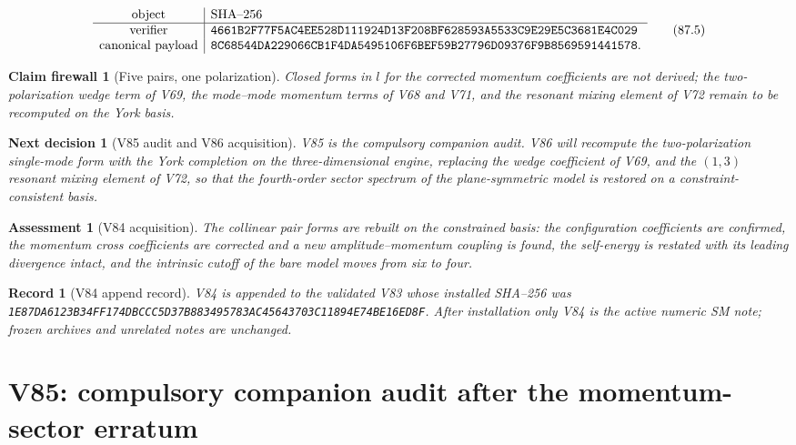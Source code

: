 \documentclass[11pt]{article}
\newtheorem{firewall}[theorem]{Claim firewall}
\newtheorem{decision}[theorem]{Next decision}
\newtheorem{assessment}[theorem]{Assessment}
\newtheorem{record}[theorem]{Record}
\theoremstyle{remark}
\begin{document}
\[
\begin{array}{c|l}
\hbox{object}&\hbox{SHA--256}\\ \hline
\hbox{verifier}&
\texttt{4661B2F77F5AC4EE528D111924D13F208BF628593A5533C9E29E5C3681E4C029}\\
\hbox{canonical payload}&
\texttt{8C68544DA229066CB1F4DA5495106F6BEF59B27796D09376F9B8569591441578}.
\end{array}                                                     \tag{87.5}
\]

\begin{firewall}[Five pairs, one polarization]
\label{fire:v19v84}
Closed forms in \(l\) for the corrected momentum coefficients are not
derived; the two-polarization wedge term of V69, the mode--mode
momentum terms of V68 and V71, and the resonant mixing element of V72
remain to be recomputed on the York basis.
\end{firewall}

\begin{decision}[V85 audit and V86 acquisition]
\label{dec:v19v84-next}
V85 is the compulsory companion audit.  V86 will recompute the
two-polarization single-mode form with the York completion on the
three-dimensional engine, replacing the wedge coefficient of V69, and
the \((1,3)\) resonant mixing element of V72, so that the fourth-order
sector spectrum of the plane-symmetric model is restored on a
constraint-consistent basis.
\end{decision}

\begin{assessment}[V84 acquisition]
\label{ass:v19v84}
The collinear pair forms are rebuilt on the constrained basis: the
configuration coefficients are confirmed, the momentum cross
coefficients are corrected and a new amplitude--momentum coupling is
found, the self-energy is restated with its leading divergence intact,
and the intrinsic cutoff of the bare model moves from six to four.
\end{assessment}

\begin{record}[V84 append record]
\label{rec:v19v84}
V84 is appended to the validated V83 whose installed SHA--256 was
\texttt{1E87DA6123B34FF174DBCCC5D37B883495783AC45643703C11894E74BE16ED8F}.
After installation only V84 is the active numeric SM note; frozen
archives and unrelated notes are unchanged.
\end{record}


\section{V85: compulsory companion audit after the momentum-sector erratum}
\label{sec:v19v85}
\end{document}
